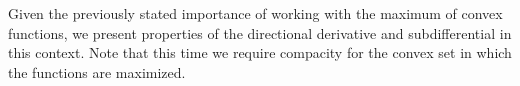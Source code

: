 \documentclass[smallextended,numbook,nospthms]{svjour3}
\theoremstyle{plain}
\newtheorem{fact}[theorem]{Fact}
\theoremstyle{definition}
\def\RR{\mathds R}
\def\NN{\mathds N}
\begin{document}



Given the previously stated importance of working with the maximum of convex functions, we present properties of the directional derivative and subdifferential in this context. Note that this time we require compacity for the convex set in which the functions are maximized.
\end{document}
